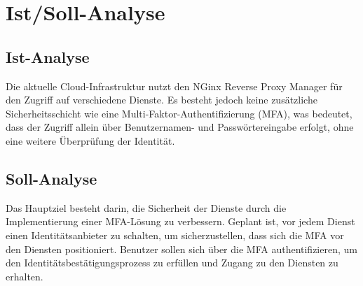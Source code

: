 \section{Ist/Soll-Analyse} 
\label{sec:IstSollAnalyse}


\subsection{Ist-Analyse} 
\label{sec:IstAnalyse}
Die aktuelle Cloud-Infrastruktur nutzt den NGinx Reverse Proxy Manager für den Zugriff auf verschiedene Dienste. 
Es besteht jedoch keine zusätzliche Sicherheitsschicht wie eine Multi-Faktor-Authentifizierung (\acs{MFA}), 
was bedeutet, dass der Zugriff allein über Benutzernamen- und Passwörtereingabe erfolgt, ohne eine weitere 
Überprüfung der Identität.

\subsection{Soll-Analyse}
\label{sec:SollAnalyse}
Das Hauptziel besteht darin, die Sicherheit der Dienste durch die Implementierung einer \acs{MFA}-Lösung 
zu verbessern. Geplant ist, vor jedem Dienst einen Identitätsanbieter zu schalten, um sicherzustellen, 
dass sich die \acs{MFA} vor den Diensten positioniert. Benutzer sollen sich über die \acs{MFA} 
authentifizieren, um den Identitätsbestätigungsprozess zu erfüllen und Zugang zu den Diensten zu 
erhalten.


